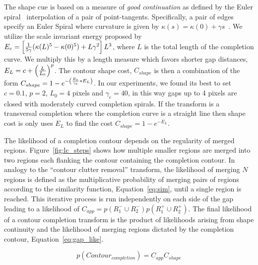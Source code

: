 The shape cue is based on a measure of \emph{good continuation} as defined by the Euler spiral~\cite{Kimia:Euler:Spiral:IJCV03} interpolation of a pair of point-tangents. Specifically, a pair of edges specify an Euler Spiral where curvature is given by $\kappa(s) = \kappa(0) + \gamma s$~\cite{Kimia:Euler:Spiral:IJCV03}. We utilize the scale invariant energy proposed by~\cite{Johannes:POCV2001}
$E_{e} = \left [ {1 \over 5\gamma } (\kappa(L)^{5}-\kappa(0)^{5}) +
L\gamma^{2} \right] L^{3}$,
where $L$ is the total length of the completion curve. We multiply this by a length measure
which favors shorter gap distances,
$E_{L} = c + \left ( {L \over L_{0}} \right ) ^{p}$.
The contour shape cost, $C_{shape}$ is then a combination of the form
$C_{shape} = 1 - e^{-\left ( {E_{e} \over \gamma_{e}}*E_{L} \right ) }$.
In our experiments, we found its best to set $c = 0.1$, $p = 2$,
$L_{0} = 4$ pixels and $\gamma_{e} = 40$, in this way gaps up to 4
pixels are closed with moderately curved completion spirals. If the transform is a transversal completion where the completion curve is a straight line then shape cost is only uses $E_{L}$ to find the cost 
$C_{shape} = 1 - e^{-E_{L}}$.

The likelihood of a completion contour depends on the regularity of merged regions. Figure~\ref{fig:lc_steps} shows how multiple smaller regions are merged into two regions each flanking the contour containing the completion contour. In analogy to the ``contour clutter removal'' transform, the likelihood of merging $N$ regions is defined as the multiplicative probability of merging pairs of regions according to the similarity function, Equation~\ref{eq:sim}, until a single region is reached. This iterative process is run independently on each side of the gap leading to a likelihood of $C_{app}=p(R_1^- \cup R_2^-)p(R_1^+ \cup R_2^+)$. The final likelihood of a contour completion transform is the product of likelihoods arising from shape continuity and the likelihood of merging regions dictated by the completion contour, Equation~\ref{eq:gap_like}.

\begin{equation}
p(Contour_{completion})=C_{app}C_{shape}
\label{eq:gap_like}
\end{equation}

